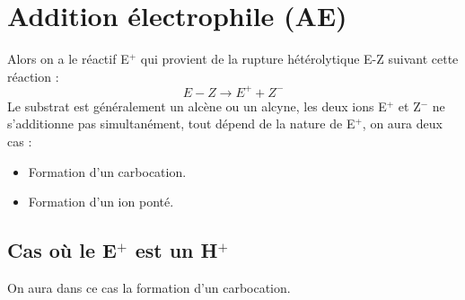 \documentclass[a4paper, oneside]{book}
\begin{document}
\section{Addition électrophile (AE)}
Alors on a le réactif E$^+$ qui provient de la rupture hétérolytique E-Z suivant cette réaction :
\[
    E - Z \longrightarrow E^+ + Z^-
\]
Le substrat est généralement un alcène ou un alcyne, les deux ions E$^+$ et Z$^-$ ne s'additionne pas simultanément, tout dépend de la nature de E$^+$, on aura deux cas :
\begin{itemize}
    \item Formation d'un carbocation.
    \item Formation d'un ion ponté.
\end{itemize}
\subsection{Cas où le E$^+$ est un H$^+$}
On aura dans ce cas la formation d'un carbocation.
\end{document}
